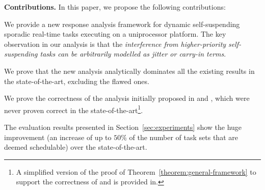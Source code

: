 \noindent\textbf{Contributions.} In this paper, we propose the following contributions:
\begin{compactitem}
\item We provide a new response analysis framework for dynamic self-suspending
  sporadic real-time tasks executing on a uniprocessor platform. The
  key observation in our analysis is that the \emph{interference from higher-priority
    self-suspending tasks can be arbitrarily modelled as jitter or
    carry-in terms}.
\item We prove that the new analysis analytically
  dominates all the existing results in the state-of-the-art, excluding the flawed ones.  
\item We prove the
  correctness of the analysis initially proposed in \cite[p.
  164-165]{Liu:2000:RS:518501} and
  \cite[p. 267]{DBLP:conf/rtss/RajkumarSL88}, which were never proven correct in the state-of-the-art\footnote{A simplified
    version of the proof of Theorem~\ref{theorem:general-framework} to support the correctness of \cite[p. 164-165]{Liu:2000:RS:518501} and \cite[p. 267]{DBLP:conf/rtss/RajkumarSL88} is
  provided in\cite{ChenHuangNelissen}.}.
\item The evaluation results presented in Section~\ref{sec:experiments} show the huge improvement (an increase of up to $50\%$ of the number of task sets that are deemed schedulable) over the state-of-the-art.
\end{compactitem}
